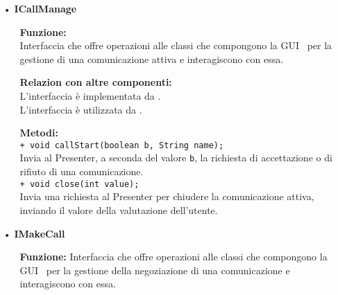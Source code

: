 {\begin{sloppypar}
{\begin{itemize}
\begin{itemize}
				terminazione della comunicazione inviando il voto dell’utente. Richiama, inoltre, il metodo 
				\texttt{graphicInitialCharge()}.\\
				\texttt{@UiHandler void onWindowClosing(Window.ClosingEvent event);}\\
				Alla chiusura della finestra vengono richiamati, attraverso i riferimenti \texttt{callManage} e 
				\texttt{communicationLogic}, ripettivamente i metodi \texttt{close(0)} e \texttt{logoutUser()}. 
				Il metodo \texttt{close(0)} viene richiamato solo nel caso in cui count sia maggiore di 0.
		\end{itemize}
	      
		\item[•] \textbf{ICallManage}
		\begin{itemize}
			\item[]  \textbf{Funzione:}\\
				Interfaccia che offre operazioni alle classi che compongono la GUI\g~ per la 
				gestione di una comunicazione attiva e interagiscono con essa.
		
			\item[]  \textbf{Relazion con altre componenti:} \\
				L’interfaccia è implementata da .\\
				L’interfaccia è utilizzata da .\\
					
			\item[]  \textbf{Metodi:}\\
				\texttt{+ void callStart(boolean b, String name);}\\
				Invia al Presenter, a seconda del valore \texttt{b}, la richiesta di accettazione o di rifiuto di una 
				comunicazione.\\
				\texttt{+ void close(int value);}\\
				Invia una richiesta al Presenter per chiudere la comunicazione attiva, inviando il 
				valore della valutazione dell’utente.\\
		\end{itemize}
            
		\item[•] \textbf{IMakeCall}
		\begin{itemize}
			\item[]  \textbf{Funzione:}
				Interfaccia che offre operazioni alle classi che compongono la 
				GUI\g~ per la gestione della negoziazione di una comunicazione e interagiscono con essa.
		

\end{itemize}
\end{itemize}}
\end{sloppypar}}
